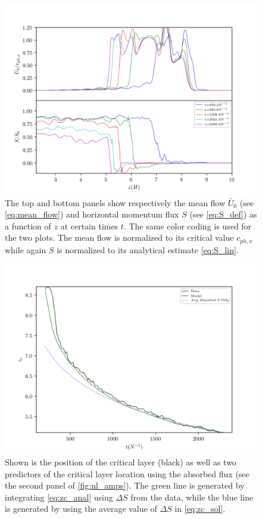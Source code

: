 \documentclass[
        fleqn,
        usenatbib,
    ]{mnras}
\begin{document}
\begin{figure}[t]
    \centering
    \includegraphics[width=\columnwidth]{plots/nl_fluxes.png}
    \caption{The top and bottom panels show respectively the mean flow
    $\bar{U}_0$ (see \autoref{eq:mean_flow}) and horizontal momentum flux $S$
    (see \autoref{eq:S_def}) as a function of $z$ at certain times $t$. The same
    color coding is used for the two plots. The mean flow is normalized to its
    critical value $c_{ph,x}$ while again $S$ is normalized to its analytical
    estimate \autoref{eq:S_lin}.}\label{fig:nl_fluxes}
\end{figure}

\begin{figure}[t]
    \centering
    \includegraphics[width=\columnwidth]{plots/nl_front.png}
    \caption{Shown is the position of the critical layer (black) as well as two
    predictors of the critical layer location using the absorbed flux (see the
    second panel of \autoref{fig:nl_amps}). The green line is generated by
    integrating \autoref{eq:zc_anal} using $\Delta S$ from the data, while the
    blue line is generated by using the average value of $\Delta S$ in
    \autoref{eq:zc_sol}.}\label{fig:nl_front}
\end{figure}
\end{document}
